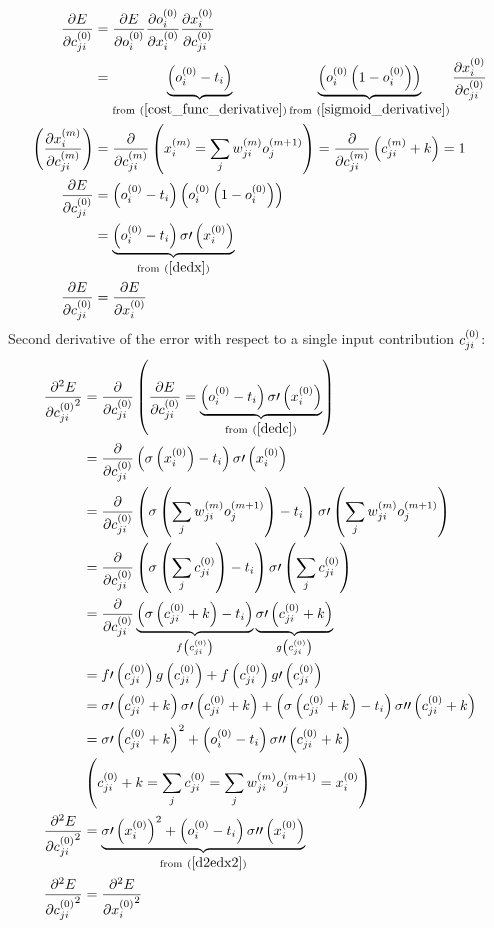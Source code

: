 \begin{align}
\pdv{E}{\Con j i 0} &= 
\pdv{E}{\Out i 0}
\pdv{\Out i 0}{\Input i 0}
\pdv{\Input i 0}{\Con j i 0}
\\
&= \underbrace{\left(\Out i 0 - \Target i \right)}_{\text{from} \ (\ref{cost_func_derivative})} \underbrace{\left(\Out i 0 \left(1 - \Out i 0\right) \right)}_{\text{from} \ (\ref{sigmoid_derivative})} \pdv{\Input i 0}{\Con j i 0} 
\\
\left( \pdv{\Input i m}{\Con j i m}\right) &= \pdv{}{\Con j i m}\left(\Input i m = \sum_j\Weight j i m\Out j {m+1} \right) = \pdv{}{\Con j i m} \left(\Con j i m + k \right) = 1\label{dxdc} 
\\
\pdv{E}{\Con j i 0}&= \left(\Out i 0 - \Target i \right) \left(\Out i 0 \left(1 - \Out i 0\right) \right)
\\
&= \underbrace{\left(\Out i 0 - \Target i \right) \sigma\prime\left(\Input i 0\right)\label{dedc}}
_{\text{from} \ (\ref{dedx})} 
\\
\pdv{E}{\Con j i 0} &= \pdv{E}{\Input i 0}
\end{align}
Second derivative of the error with respect to a single input contribution $c_{ji}^{(0)}$:
\begin{align}
\pdv[2]{E}{{c_{ji}^{(0)}}} &=
\pdv{}{c_{ji}^{(0)}} 
\left(\pdv{E}{c_{ji}^{(0)}} = 
\underbrace{\left(o_{i}^{(0)} - t_{i} \right) \sigma\prime\left(x_{i}^{(0)}\right)}
_{\text{from} \ (\ref{dedc})}
\right)
\\
&=\pdv{}{c_{ji}^{(0)}}\left(\sigma\left(x_{i}^{(0)}\right) - t_{i} \right) \sigma\prime\left(x_{i}^{(0)}\right)
\\
&=\pdv{}{c_{ji}^{(0)}}\left(\sigma\left(\sum\limits_j {w_{ji}^{(m)}}{ o_{j}^{(m + 1)}}\right) - t_{i} \right) \sigma\prime\left(\sum\limits_j {w_{ji}^{(m)}}{ o_{j}^{(m + 1)}}\right)
\\
&=\pdv{}{c_{ji}^{(0)}}\left(\sigma\left(\sum\limits_j {c_{ji}^{(0)}}\right) - t_{i} \right) \sigma\prime\left(\sum\limits_j {c_{ji}^{(0)}}\right)
\\
&=\pdv{}{c_{ji}^{(0)}}
\underbrace{\left(\sigma\left({c_{ji}^{(0)}} + k\right) - t_{i} \right)}
_{f\left(c_{ji}^{(0)}\right)}
\underbrace{\sigma\prime\left({c_{ji}^{(0)}} + k\right)}
_{g\left(c_{ji}^{(0)}\right)}
\\
&=f\prime\left(c_{ji}^{(0)}\right)g\left(c_{ji}^{(0)}\right) + f\left(c_{ji}^{(0)}\right)g\prime\left(c_{ji}^{(0)}\right)
\\
&=\sigma\prime\left({c_{ji}^{(0)}} + k\right)\sigma\prime\left({c_{ji}^{(0)}} + k\right) + 
\left(\sigma\left({c_{ji}^{(0)}} + k\right) - t_{i} \right)\sigma\prime\prime\left({c_{ji}^{(0)}} + k\right)
\\
&=\sigma\prime\left({c_{ji}^{(0)}} + k\right)^2 + 
\left(o_{i}^{(0)} - t_{i} \right)\sigma\prime\prime\left({c_{ji}^{(0)}} + k\right)
\\
&\left(c_{ji}^{(0)} + k = \sum_j{c_{ji}^{(0)}} = \sum\limits_j {w_{ji}^{(m)}}{ o_{j}^{(m + 1)}} = x_{i}^{(0)} \right)
\\
\pdv[2]{E}{{c_{ji}^{(0)}}}&=
\underbrace{\sigma\prime\left(x_{i}^{(0)}\right)^2 + 
\left(o_{i}^{(0)} - t_{i} \right)\sigma\prime\prime\left(x_{i}^{(0)}\right)}
_{\text{from} \ (\ref{d2edx2})}
\\
\pdv[2]{E}{{c_{ji}^{(0)}}} &= \pdv[2]{E}{{x_{i}^{(0)}}}
\end{align}
